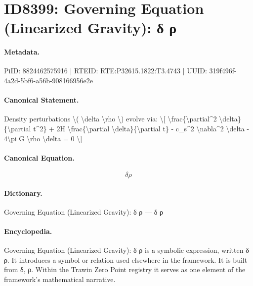 \section*{ID8399: Governing Equation (Linearized Gravity): δ ρ}
\paragraph{Metadata.}
PiID: 8824462575916 | RTEID: RTE:P32615.1822:T3.4743 | UUID: 319f496f-4a2d-5bf6-a56b-908166956e2e

\paragraph{Canonical Statement.}
Density perturbations \textbackslash{}( \textbackslash{}delta \textbackslash{}rho \textbackslash{}) evolve via: \textbackslash{}[ \textbackslash{}frac\{\textbackslash{}partial\textasciicircum{}2 \textbackslash{}delta\}\{\textbackslash{}partial t\textasciicircum{}2\} + 2H \textbackslash{}frac\{\textbackslash{}partial \textbackslash{}delta\}\{\textbackslash{}partial t\} - c\_s\textasciicircum{}2 \textbackslash{}nabla\textasciicircum{}2 \textbackslash{}delta - 4\textbackslash{}pi G \textbackslash{}rho \textbackslash{}delta = 0 \textbackslash{}]

\paragraph{Canonical Equation.}
\[
\delta \rho
\]

\paragraph{Dictionary.}
Governing Equation (Linearized Gravity): δ ρ — δ ρ

\paragraph{Encyclopedia.}
Governing Equation (Linearized Gravity): δ ρ is a symbolic expression, written δ ρ. It introduces a symbol or relation used elsewhere in the framework. It is built from δ, ρ. Within the Trawin Zero Point registry it serves as one element of the framework's mathematical narrative.

